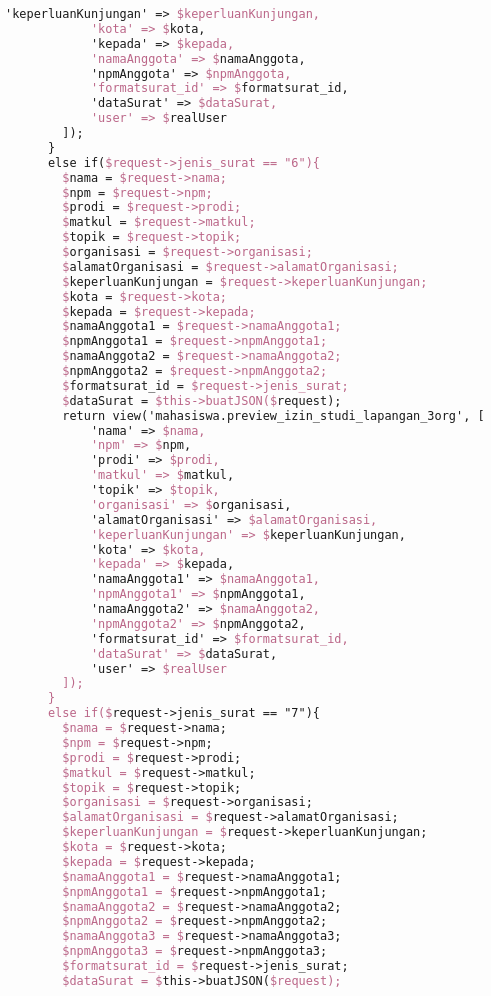 \begin{lstlisting}[language=tex,basicstyle=\tiny,caption=PesanansuratController.php]
            'keperluanKunjungan' => $keperluanKunjungan,
            'kota' => $kota,
            'kepada' => $kepada,
            'namaAnggota' => $namaAnggota,
            'npmAnggota' => $npmAnggota,
            'formatsurat_id' => $formatsurat_id,
            'dataSurat' => $dataSurat,
            'user' => $realUser
        ]);
      }
      else if($request->jenis_surat == "6"){
        $nama = $request->nama;
        $npm = $request->npm;
        $prodi = $request->prodi;
        $matkul = $request->matkul;
        $topik = $request->topik;
        $organisasi = $request->organisasi;
        $alamatOrganisasi = $request->alamatOrganisasi;
        $keperluanKunjungan = $request->keperluanKunjungan;
        $kota = $request->kota;
        $kepada = $request->kepada;
        $namaAnggota1 = $request->namaAnggota1;
        $npmAnggota1 = $request->npmAnggota1;
        $namaAnggota2 = $request->namaAnggota2;
        $npmAnggota2 = $request->npmAnggota2;
        $formatsurat_id = $request->jenis_surat;
        $dataSurat = $this->buatJSON($request);
        return view('mahasiswa.preview_izin_studi_lapangan_3org', [
            'nama' => $nama,
            'npm' => $npm,
            'prodi' => $prodi,
            'matkul' => $matkul,
            'topik' => $topik,
            'organisasi' => $organisasi,
            'alamatOrganisasi' => $alamatOrganisasi,
            'keperluanKunjungan' => $keperluanKunjungan,
            'kota' => $kota,
            'kepada' => $kepada,
            'namaAnggota1' => $namaAnggota1,
            'npmAnggota1' => $npmAnggota1,
            'namaAnggota2' => $namaAnggota2,
            'npmAnggota2' => $npmAnggota2,
            'formatsurat_id' => $formatsurat_id,
            'dataSurat' => $dataSurat,
            'user' => $realUser
        ]);
      }
      else if($request->jenis_surat == "7"){
        $nama = $request->nama;
        $npm = $request->npm;
        $prodi = $request->prodi;
        $matkul = $request->matkul;
        $topik = $request->topik;
        $organisasi = $request->organisasi;
        $alamatOrganisasi = $request->alamatOrganisasi;
        $keperluanKunjungan = $request->keperluanKunjungan;
        $kota = $request->kota;
        $kepada = $request->kepada;
        $namaAnggota1 = $request->namaAnggota1;
        $npmAnggota1 = $request->npmAnggota1;
        $namaAnggota2 = $request->namaAnggota2;
        $npmAnggota2 = $request->npmAnggota2;
        $namaAnggota3 = $request->namaAnggota3;
        $npmAnggota3 = $request->npmAnggota3;
        $formatsurat_id = $request->jenis_surat;
        $dataSurat = $this->buatJSON($request);

\end{lstlisting}
